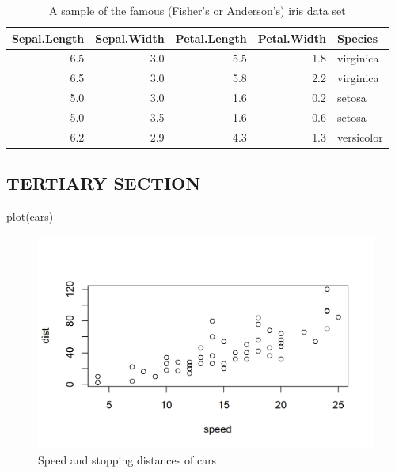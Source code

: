 \documentclass[
  12pt,
  a4paper,
  oneside]{tesesusp}
\newenvironment{Shaded}{\begin{snugshade}}{\end{snugshade}}
\newcommand{\FunctionTok}[1]{\textcolor[rgb]{0.28,0.35,0.67}{#1}}
\newcommand{\NormalTok}[1]{\textcolor[rgb]{0.00,0.23,0.31}{#1}}
\begin{document}
\begin{table}
\caption{A sample of the famous (Fisher's or Anderson's) iris data set}\tabularnewline

\centering
\begin{tabular}{r|r|r|r|l}
\hline
Sepal.Length & Sepal.Width & Petal.Length & Petal.Width & Species\\
\hline
6.5 & 3.0 & 5.5 & 1.8 & virginica\\
\hline
6.5 & 3.0 & 5.8 & 2.2 & virginica\\
\hline
5.0 & 3.0 & 1.6 & 0.2 & setosa\\
\hline
5.0 & 3.5 & 1.6 & 0.6 & setosa\\
\hline
6.2 & 2.9 & 4.3 & 1.3 & versicolor\\
\hline
\end{tabular}
\end{table}

\hypertarget{tertiary-section}{%
\subsection{TERTIARY SECTION}\label{tertiary-section}}

\begin{Shaded}
\begin{Highlighting}[numbers=left,,]
\FunctionTok{plot}\NormalTok{(cars)}
\end{Highlighting}
\end{Shaded}

\begin{figure}[H]

\caption{Speed and stopping distances of cars}

{\centering \includegraphics{index_files/figure-pdf/unnamed-chunk-4-1.png}

}

\end{figure}
\end{document}
